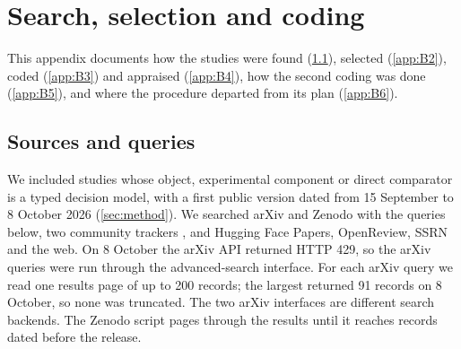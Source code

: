 \section{Search, selection and coding}\label{app:B}

This appendix documents how the studies were found (\cref{app:B1}), selected (\cref{app:B2}), coded (\cref{app:B3}) and appraised (\cref{app:B4}), how the second coding was done (\cref{app:B5}), and where the procedure departed from its plan (\cref{app:B6}).

\subsection{Sources and queries}\label{app:B1}

We included studies whose object, experimental component or direct comparator is a typed decision model, with a first public version dated from 15 September to 8 October 2026 (\cref{sec:method}). We searched arXiv and Zenodo with the queries below, two community trackers \cite{xiao2026allaboutjev,rafe2026awesome}, and Hugging Face Papers, OpenReview, SSRN and the web. On 8 October the arXiv API returned HTTP 429, so the arXiv queries were run through the advanced-search interface. For each arXiv query we read one results page of up to 200 records; the largest returned 91 records on 8 October, so none was truncated. The two arXiv interfaces are different search backends. The Zenodo script pages through the results until it reaches records dated before the release.

